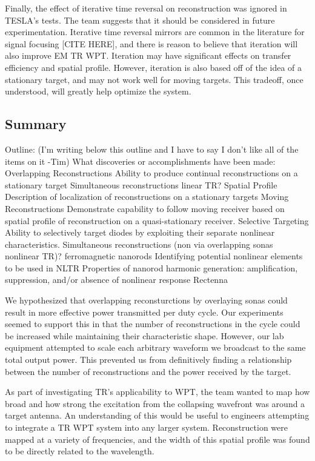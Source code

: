 Finally, the effect of iterative time reversal on reconstruction was ignored in TESLA's tests.  The team suggests that it should be considered in future experimentation. Iterative time reversal mirrors are common in the literature for signal focusing [CITE HERE], and there is reason to believe that iteration will also improve EM TR WPT.  Iteration may have significant effects on transfer efficiency and spatial profile.  However, iteration is also based off of the idea of a stationary target, and may not work well for moving targets.  This tradeoff, once understood, will greatly help optimize the system.

\subsection{Summary}

Outline: (I'm writing below this outline and I have to say I don't like all of the items on it -Tim)
	What discoveries or accomplishments have been made:
Overlapping Reconstructions
Ability to produce continual reconstructions on a stationary target
Simultaneous reconstructions {linear TR}?
Spatial Profile
Description of localization of reconstructions on a stationary targets
Moving Reconstructions
Demonstrate capability to follow moving receiver based on spatial profile of reconstruction on a quasi-stationary receiver.
Selective Targeting
Ability to selectively target diodes by exploiting their separate nonlinear characteristics.
Simultaneous reconstructions (non via overlapping sonas {nonlinear TR})?
ferromagnetic nanorods
Identifying potential nonlinear elements to be used in NLTR
Properties of nanorod harmonic generation: amplification, suppression, and/or absence of nonlinear response
Rectenna

We hypothesized that overlapping reconsturctions by overlaying sonas could result in more effective power transmitted per duty cycle. Our experiments seemed to support this in that the number of reconstructions in the cycle could be increased while maintaining their characteristic shape. However, our lab equipment attempted to scale each arbitrary waveform we broadcast to the same total output power. This prevented us from definitively finding a relationship between the number of reconstructions and the power received by the target.

As part of investigating TR's applicability to WPT, the team wanted to map how broad and how strong the excitation from the collapsing wavefront was around a target antenna. An understanding of this would be useful to engineers attempting to integrate a TR WPT system into any larger system. Reconstruction were mapped at a variety of frequencies, and the width of this spatial profile was found to be directly related to the wavelength.

